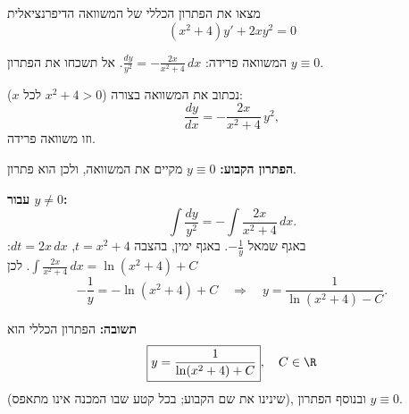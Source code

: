 
\begin{question}
מצאו את הפתרון הכללי של המשוואה הדיפרנציאלית
\[ (x^2 + 4)y' + 2xy^2 = 0 \]
\end{question}

\begin{hint}
המשוואה פרידה: $\frac{dy}{y^2} = -\frac{2x}{x^2 + 4}\,dx$. אל תשכחו את הפתרון $y \equiv 0$.
\end{hint}

\begin{solution}
נכתוב את המשוואה בצורה ($x^2 + 4 > 0$ לכל $x$):
\[ \frac{dy}{dx} = -\frac{2x}{x^2 + 4}\, y^2, \]
וזו משוואה פרידה.

\textbf{הפתרון הקבוע:} $y \equiv 0$ מקיים את המשוואה, ולכן הוא פתרון.

\textbf{עבור $y \ne 0$:}
\[ \int \frac{dy}{y^2} = -\int \frac{2x}{x^2 + 4}\,dx. \]
באגף שמאל $-\frac1y$. באגף ימין, בהצבה $t = x^2 + 4$, $dt = 2x\,dx$: $\int \frac{2x}{x^2 + 4}\,dx = \ln(x^2 + 4) + C$. לכן
\[ -\frac{1}{y} = -\ln(x^2 + 4) + C \quad\Longrightarrow\quad y = \frac{1}{\ln(x^2 + 4) - C}. \]

\textbf{תשובה:} הפתרון הכללי הוא
\[ \boxed{y = \frac{1}{\ln(x^2 + 4) + C}}, \quad C \in \R \]
(שינינו את שם הקבוע; בכל קטע שבו המכנה אינו מתאפס), ובנוסף הפתרון $y \equiv 0$.
\end{solution}
